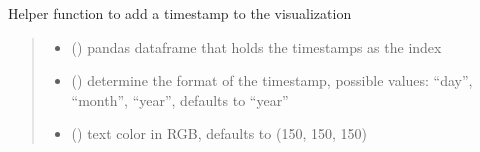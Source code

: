 \documentclass[letterpaper,10pt,english]{sphinxmanual}
\begin{document}
\begin{fulllineitems}
\begin{fulllineitems}
\begin{quote}
\begin{description}
\begin{itemize}
\end{itemize}

\end{description}\end{quote}

\end{fulllineitems}


\begin{fulllineitems}
\label{\detokenize{index:sjvisualizer.Canvas.canvas.add_time}}
\pysigstartsignatures
{}
\pysigstopsignatures
\sphinxAtStartPar
Helper function to add a timestamp to the visualization
\begin{quote}\begin{description}
\begin{itemize}
\item {} 
\sphinxAtStartPar
{} () \textendash{} pandas dataframe that holds the timestamps as the index

\item {} 
\sphinxAtStartPar
{} () \textendash{} determine the format of the timestamp, possible values: “day”, “month”, “year”, defaults to “year”

\item {} 
\sphinxAtStartPar
{} () \textendash{} text color in RGB, defaults to (150, 150, 150)

\end{itemize}

\end{description}\end{quote}

\end{fulllineitems}


\end{fulllineitems}
\end{document}
